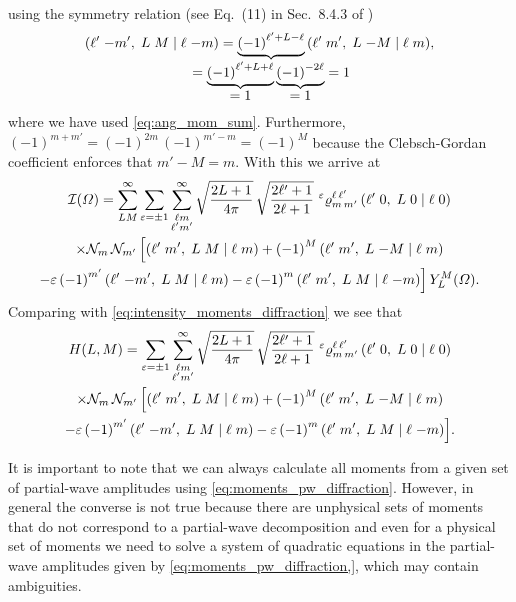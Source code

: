 using the symmetry relation (see Eq.~(11) in Sec.~8.4.3 of
)
\begin{equation}
  \clebsch{\ell'}{-m'}{L}{M}{\ell}{-m}
  = \cdUnderbrace{{(-1)}^{\ell' + L - \ell}}{= \dUnderbrace{{(-1)}^{\ell' + L + \ell}}{= 1}\, \dUnderbrace{{(-1)}^{-2 \ell}}{= 1} = 1}\, \clebsch{\ell'}{m'}{L}{-M}{\ell}{m},
\end{equation}
where we have used \cref{eq:ang_mom_sum}.  Furthermore, ${(-1)}^{m + m'}
= {(-1)}^{2m}\, {(-1)}^{m' - m} = {(-1)}^M$ because the Clebsch-Gordan
coefficient enforces that $m' - M = m$.  With this we arrive at
\begin{multline}
  \mathcal{I}(\Omega)
  = \sum_{L M}^\infty \sum_{\varepsilon = \pm 1} \sum_{\substack{\ell m \\ \ell' m'}}^\infty
    \sqrt{\frac{2 L + 1}{4 \pi}}\, \sqrt{\frac{2 \ell' + 1}{2 \ell + 1}}\,
    \prescript{\ensuremath{\varepsilon}}{}{\varrho}^{\ell\, \ell'}_{m\, m'}\, ({\ell'}\;{0},\;{L}\;{0}\; |\; {\ell}\;{0}) \\
    \times \mathcal{N}_m\, \mathcal{N}_{m'}\, \Big[
      ({\ell'}\;{m'},\;{L}\;{M}\; |\; {\ell}\;{m})
      + {(-1)}^M\, ({\ell'}\;{m'},\;{L}\;{-M}\; |\; {\ell}\;{m}) \\
      - \varepsilon\, {(-1)}^{m'}\, ({\ell'}\;{-m'},\;{L}\;{M}\; |\; {\ell}\;{m})
      - \varepsilon\, {(-1)}^m\, ({\ell'}\;{m'},\;{L}\;{M}\; |\; {\ell}\;{-m}) \Big]\,
    Y_L^M(\Omega).
\end{multline}
Comparing with \cref{eq:intensity_moments_diffraction} we see that
\begin{multline}
  \label{eq:moments_pw_diffraction}
  H(L, M)
  = \sum_{\varepsilon = \pm 1} \sum_{\substack{\ell m \\ \ell' m'}}^\infty
    \sqrt{\frac{2 L + 1}{4 \pi}}\, \sqrt{\frac{2 \ell' + 1}{2 \ell + 1}}\,
    \prescript{\ensuremath{\varepsilon}}{}{\varrho}^{\ell\, \ell'}_{m\, m'}\, ({\ell'}\;{0},\;{L}\;{0}\; |\; {\ell}\;{0}) \\
    \times \mathcal{N}_m\, \mathcal{N}_{m'}\, \Big[
      ({\ell'}\;{m'},\;{L}\;{M}\; |\; {\ell}\;{m})
      + {(-1)}^M\, ({\ell'}\;{m'},\;{L}\;{-M}\; |\; {\ell}\;{m}) \\
      - \varepsilon\, {(-1)}^{m'}\, ({\ell'}\;{-m'},\;{L}\;{M}\; |\; {\ell}\;{m})
      - \varepsilon\, {(-1)}^m\, ({\ell'}\;{m'},\;{L}\;{M}\; |\; {\ell}\;{-m}) \Big].
\end{multline}

It is important to note that we can always calculate all moments from
a given set of partial-wave amplitudes using
\cref{eq:moments_pw_diffraction}.  However, in general the converse is
not true because there are unphysical sets of moments that do not
correspond to a partial-wave decomposition and even for a physical set
of moments we need to solve a system of quadratic equations in the
partial-wave amplitudes given by \cref{eq:moments_pw_diffraction,},
which may contain ambiguities.

